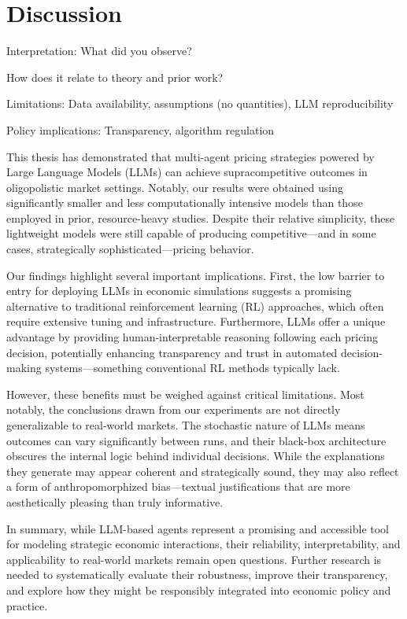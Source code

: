 \section{Discussion}\label{sec:dis}

Interpretation: What did you observe?

How does it relate to theory and prior work?

Limitations: Data availability, assumptions (no quantities), LLM reproducibility

Policy implications: Transparency, algorithm regulation



This thesis has demonstrated that multi-agent pricing strategies powered by Large Language Models (LLMs) can achieve supracompetitive outcomes in oligopolistic market settings. Notably, our results were obtained using significantly smaller and less computationally intensive models than those employed in prior, resource-heavy studies. Despite their relative simplicity, these lightweight models were still capable of producing competitive—and in some cases, strategically sophisticated—pricing behavior.

Our findings highlight several important implications. First, the low barrier to entry for deploying LLMs in economic simulations suggests a promising alternative to traditional reinforcement learning (RL) approaches, which often require extensive tuning and infrastructure. Furthermore, LLMs offer a unique advantage by providing human-interpretable reasoning following each pricing decision, potentially enhancing transparency and trust in automated decision-making systems—something conventional RL methods typically lack.

However, these benefits must be weighed against critical limitations. Most notably, the conclusions drawn from our experiments are not directly generalizable to real-world markets. The stochastic nature of LLMs means outcomes can vary significantly between runs, and their black-box architecture obscures the internal logic behind individual decisions. While the explanations they generate may appear coherent and strategically sound, they may also reflect a form of anthropomorphized bias—textual justifications that are more aesthetically pleasing than truly informative.

In summary, while LLM-based agents represent a promising and accessible tool for modeling strategic economic interactions, their reliability, interpretability, and applicability to real-world markets remain open questions. Further research is needed to systematically evaluate their robustness, improve their transparency, and explore how they might be responsibly integrated into economic policy and practice.
